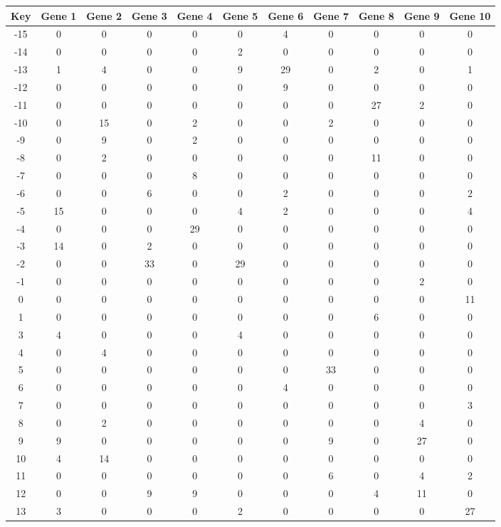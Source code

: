 \begin{tabular}{|c|c|c|c|c|c|c|c|c|c|c|}
\hline
Key & Gene 1 & Gene 2 & Gene 3 & Gene 4 & Gene 5 & Gene 6 & Gene 7 & Gene 8 & Gene 9 & Gene 10 \\
\hline
-15 & 0 & 0 & 0 & 0 & 0 & 4 & 0 & 0 & 0 & 0 \\
-14 & 0 & 0 & 0 & 0 & 2 & 0 & 0 & 0 & 0 & 0 \\
-13 & 1 & 4 & 0 & 0 & 9 & 29 & 0 & 2 & 0 & 1 \\
-12 & 0 & 0 & 0 & 0 & 0 & 9 & 0 & 0 & 0 & 0 \\
-11 & 0 & 0 & 0 & 0 & 0 & 0 & 0 & 27 & 2 & 0 \\
-10 & 0 & 15 & 0 & 2 & 0 & 0 & 2 & 0 & 0 & 0 \\
-9 & 0 & 9 & 0 & 2 & 0 & 0 & 0 & 0 & 0 & 0 \\
-8 & 0 & 2 & 0 & 0 & 0 & 0 & 0 & 11 & 0 & 0 \\
-7 & 0 & 0 & 0 & 8 & 0 & 0 & 0 & 0 & 0 & 0 \\
-6 & 0 & 0 & 6 & 0 & 0 & 2 & 0 & 0 & 0 & 2 \\
-5 & 15 & 0 & 0 & 0 & 4 & 2 & 0 & 0 & 0 & 4 \\
-4 & 0 & 0 & 0 & 29 & 0 & 0 & 0 & 0 & 0 & 0 \\
-3 & 14 & 0 & 2 & 0 & 0 & 0 & 0 & 0 & 0 & 0 \\
-2 & 0 & 0 & 33 & 0 & 29 & 0 & 0 & 0 & 0 & 0 \\
-1 & 0 & 0 & 0 & 0 & 0 & 0 & 0 & 0 & 2 & 0 \\
0 & 0 & 0 & 0 & 0 & 0 & 0 & 0 & 0 & 0 & 11 \\
1 & 0 & 0 & 0 & 0 & 0 & 0 & 0 & 6 & 0 & 0 \\
3 & 4 & 0 & 0 & 0 & 4 & 0 & 0 & 0 & 0 & 0 \\
4 & 0 & 4 & 0 & 0 & 0 & 0 & 0 & 0 & 0 & 0 \\
5 & 0 & 0 & 0 & 0 & 0 & 0 & 33 & 0 & 0 & 0 \\
6 & 0 & 0 & 0 & 0 & 0 & 4 & 0 & 0 & 0 & 0 \\
7 & 0 & 0 & 0 & 0 & 0 & 0 & 0 & 0 & 0 & 3 \\
8 & 0 & 2 & 0 & 0 & 0 & 0 & 0 & 0 & 4 & 0 \\
9 & 9 & 0 & 0 & 0 & 0 & 0 & 9 & 0 & 27 & 0 \\
10 & 4 & 14 & 0 & 0 & 0 & 0 & 0 & 0 & 0 & 0 \\
11 & 0 & 0 & 0 & 0 & 0 & 0 & 6 & 0 & 4 & 2 \\
12 & 0 & 0 & 9 & 9 & 0 & 0 & 0 & 4 & 11 & 0 \\
13 & 3 & 0 & 0 & 0 & 2 & 0 & 0 & 0 & 0 & 27 \\
\hline
\end{tabular}